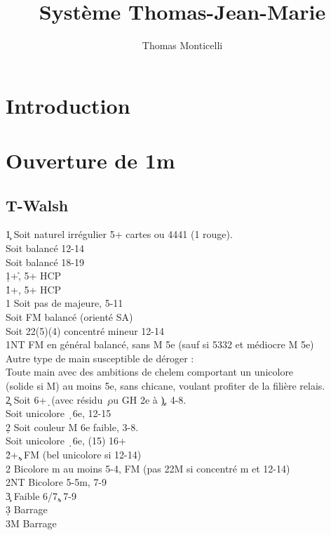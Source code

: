 \documentclass[a4paper]{article}
\title{Système Thomas-Jean-Marie}
\author{Thomas Monticelli}
\begin{document}
\maketitle
\tableofcontents

\section{Introduction}

\section{Ouverture de 1m}

\subsection{T-Walsh}

\begin{bidtable}
1\c \> Soit naturel irrégulier 5+ cartes ou 4441 (1 rouge).\+\\
Soit \> balancé 12-14\\
Soit \> balancé 18-19\\
1\d {}+\h , 5+ HCP\\
1\h {}+\s , 5+ HCP\\
1\s \> Soit pas de majeure, 5-11\\
\>Soit FM balancé (orienté SA)\\
\>Soit 22(5)(4) concentré mineur 12-14\\
1NT \> FM en général balancé, sans M 5e (sauf si 5332 et médiocre M 5e)\\
\>Autre type de main susceptible de déroger : \\
\>Toute main avec des ambitions de chelem comportant un unicolore \\
\>(solide si M) au moins 5e, sans chicane, voulant profiter de la filière relais.\\
2\c \> Soit 6+\d\ (avec résidu \c\ ou GH 2e à \c ), 4-8.\\
\>Soit unicolore \d\ 6e, 12-15\\
2\d \> Soit couleur M 6e faible, 3-8.\\
\>Soit unicolore \d\ 6e, (15) 16+\\
2\h {}+\c , FM (bel unicolore si 12-14)\\
2\s \> Bicolore m au moins 5-4, FM (pas 22M si concentré m et 12-14)\\
2NT \> Bicolore 5-5m, 7-9\\
3\c \> Faible 6/7\c , 7-9\\
3\d \> Barrage\\
3M \> Barrage\-
\end{bidtable}
\end{document}

